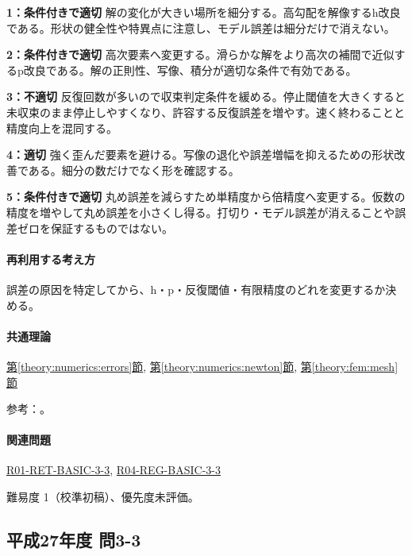 \noindent\textbf{1：条件付きで適切} 解の変化が大きい場所を細分する。高勾配を解像するh改良である。形状の健全性や特異点に注意し、モデル誤差は細分だけで消えない。\par

\noindent\textbf{2：条件付きで適切} 高次要素へ変更する。滑らかな解をより高次の補間で近似するp改良である。解の正則性、写像、積分が適切な条件で有効である。\par

\noindent\textbf{3：不適切} 反復回数が多いので収束判定条件を緩める。停止閾値を大きくすると未収束のまま停止しやすくなり、許容する反復誤差を増やす。速く終わることと精度向上を混同する。\par

\noindent\textbf{4：適切} 強く歪んだ要素を避ける。写像の退化や誤差増幅を抑えるための形状改善である。細分の数だけでなく形を確認する。\par

\noindent\textbf{5：条件付きで適切} 丸め誤差を減らすため単精度から倍精度へ変更する。仮数の精度を増やして丸め誤差を小さくし得る。打切り・モデル誤差が消えることや誤差ゼロを保証するものではない。\par

\paragraph{再利用する考え方} 誤差の原因を特定してから、h・p・反復閾値・有限精度のどれを変更するか決める。

\paragraph{共通理論} \hyperref[theory:numerics:errors]{第\ref*{theory:numerics:errors}節}, \hyperref[theory:numerics:newton]{第\ref*{theory:numerics:newton}節}, \hyperref[theory:fem:mesh]{第\ref*{theory:fem:mesh}節}

\par 参考：\cite{mit_roy_fea1999,goldberg1991,nist_newton}。

\paragraph{関連問題} \hyperref[q:r01-ret-basic-3-3]{R01-RET-BASIC-3-3}, \hyperref[q:r04-reg-basic-3-3]{R04-REG-BASIC-3-3}

\par 難易度 1（校準初稿）、優先度未評価。

\subsection{平成27年度 問3-3}
\label{q:h27-reg-basic-3-3}

